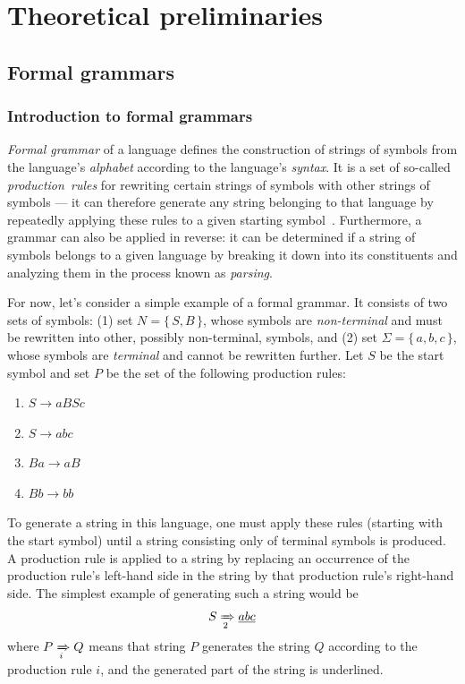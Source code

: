 \documentclass[english,engineering]{wizthesis}
\begin{document}
\chapter{Theoretical preliminaries}

\section{Formal grammars}

\subsection{Introduction to formal grammars}

\emph{Formal grammar} of a language defines the construction of strings of
symbols from the language's \emph{alphabet} according to the language's
\emph{syntax}. It is a set of so-called \emph{production~rules} for
rewriting certain strings of symbols with other strings of symbols --- it can
therefore generate any string belonging to that language by repeatedly applying
these rules to a given starting symbol~\cite{meduna-2014}. Furthermore, a
grammar can also be applied in reverse: it can be determined if a string of
symbols belongs to a given language by breaking it down into its constituents
and analyzing them in the process known as \emph{parsing}.

For now, let's consider a simple example of a formal grammar. It consists of two
sets of symbols: (1) set $N = \{\,S, B\,\}$, whose symbols are
\emph{non-terminal} and must be rewritten into other, possibly non-terminal,
symbols, and (2) set $\Sigma = \{\,a, b, c\,\}$, whose symbols are
\emph{terminal} and cannot be rewritten further. Let $S$ be the start symbol
and set $P$ be the set of the following production rules:
\begin{enumerate}[noitemsep]
  \item $S \rightarrow aBSc$
  \item $S \rightarrow abc$
  \item $Ba \rightarrow aB$
  \item $Bb \rightarrow bb$
\end{enumerate}
To generate a string in this language, one must apply these rules (starting with
the start symbol) until a string consisting only of terminal symbols is
produced. A production rule is applied to a string by replacing an occurrence
of the production rule's left-hand side in the string by that production rule's
right-hand side. The simplest example of generating such a string would be
\begin{equation*}
  S \xRightarrow[2]{} \underline{abc}
\end{equation*}
where $P \xRightarrow[i]{} Q$ means that string $P$ generates the string $Q$
according to the production rule $i$, and the generated part of the string
is underlined.
\end{document}
